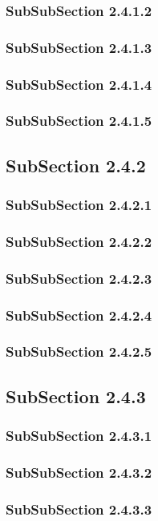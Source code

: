 \subsubsection{SubSubSection 2.4.1.2}
\subsubsection{SubSubSection 2.4.1.3}
\subsubsection{SubSubSection 2.4.1.4}
\subsubsection{SubSubSection 2.4.1.5}
\subsection{SubSection 2.4.2}
\subsubsection{SubSubSection 2.4.2.1}
\subsubsection{SubSubSection 2.4.2.2}
\subsubsection{SubSubSection 2.4.2.3}
\subsubsection{SubSubSection 2.4.2.4}
\subsubsection{SubSubSection 2.4.2.5}
\subsection{SubSection 2.4.3}
\subsubsection{SubSubSection 2.4.3.1}
\subsubsection{SubSubSection 2.4.3.2}
\subsubsection{SubSubSection 2.4.3.3}
